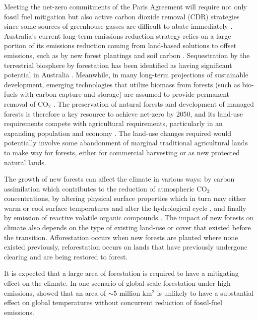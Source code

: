 \documentclass[]{article}
\begin{document}
Meeting the net-zero commitments of the Paris Agreement will require not only fossil fuel mitigation but also active carbon dioxide removal (CDR) strategies since some sources of greenhouse gasses are difficult to abate immediately \parencite{van_vuuren_rcp26_2011, vaughan_review_2011, rogelj_emission_2011}.
Australia's current long-term emissions reduction strategy relies on a large portion of its emissions reduction coming from land-based solutions to offset emissions, such as by new forest plantings and soil carbon \parencite{smith_longterm_2022, australian_government_2021}.
Sequestration by the terrestrial biosphere by forestation has been identified as having significant potential in Australia \parencite{fitch_australias_2022}.
Meanwhile, in many long-term projections of sustainable development, emerging technologies that utilize biomass from forests (such as bio-fuels with carbon capture and storage) are assumed to provide permanent removal of CO$_2$ \parencite{pour_opportunities_2018}.
The preservation of natural forests and development of managed forests is therefore a key resource to achieve net-zero by 2050, and its land-use requirements compete with agricultural requirements, particularly in an expanding population and economy \parencite{fitch_australias_2022}.
The land-use changes required would potentially involve some abandonment of marginal traditional agricultural lands to make way for forests, either for commercial harvesting or as new protected natural lands.

The growth of new forests can affect the climate in various ways: by carbon assimilation which contributes to the reduction of atmospheric CO$_2$ concentrations, by altering physical surface properties which in turn may either warm or cool surface temperatures and alter the hydrological cycle \parencite{pongratz_biogeophysical_2010}, and finally by emission of reactive volatile organic compounds \parencite{weber_chemistry_albedo_2024}. The impact of new forests on climate also depends on the type of existing land-use or cover that existed before the transition. Afforestation occurs when new forests are planted where none existed previously, reforestation occurs on lands that have previously undergone clearing and are being restored to forest.

It is expected that a large area of forestation is required to have a mitigating effect on the climate.
In one scenario of global-scale forestation under high emissions, \cite{loughran_limited_2023} showed that an area of $\sim$5 million km$^2$ is unlikely to have a substantial effect on global temperatures without concurrent reduction of fossil-fuel emissions.
\end{document}
